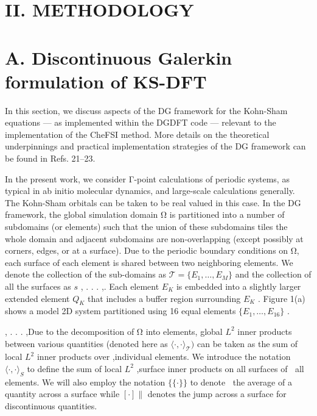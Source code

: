 \documentclass[
  10
]{article}
\begin{document}
\section{II. METHODOLOGY}\label{ii.-methodology}

\section{A. Discontinuous Galerkin formulation of
KS-DFT}\label{a.-discontinuous-galerkin-formulation-of-ks-dft}

In this section, we discuss aspects of the DG framework for the
Kohn-Sham equations --- as implemented within the DGDFT code ---
relevant to the implementation of the CheFSI method. More details on the
theoretical underpinnings and practical implementation strategies of the
DG framework can be found in Refs. 21--23.

In the present work, we consider Γ-point calculations of periodic
systems, as typical in ab initio molecular dynamics, and large-scale
calculations generally. The Kohn-Sham orbitals can be taken to be real
valued in this case. In the DG framework, the global simulation domain Ω
is partitioned into a number of subdomains (or elements) such that the
union of these subdomains tiles the whole domain and adjacent subdomains
are non-overlapping (except possibly at corners, edges, or at a
surface). Due to the periodic boundary conditions on Ω, each surface of
each element is shared between two neighboring elements. We denote the
collection of the sub-domains as
\(\mathcal { T } = \{ E _ { 1 } , \dots , E _ { M } \}\) and the
collection of all the surfaces as \(s\) , . . . ,. Each element
\(E _ { K }\) is embedded into a slightly larger extended element
\(Q _ { K }\) that includes a buffer region surrounding \(E _ { K }\) .
Figure 1(a) shows a model 2D system partitioned using 16 equal elements
\(\{ E _ { 1 } , \ldots , E _ { 1 6 } \}\) .

, . . . ,Due to the decomposition of Ω into elements, global
\(L ^ { 2 }\) inner products between various quantities (denoted here as
\(\langle \cdot , \cdot \rangle _ { \mathcal { T } } )\) can be taken as
the sum of local \(L ^ { 2 }\) inner products over ,individual elements.
We introduce the notation \(\langle \cdot , \cdot \rangle _ { S }\) to
define the sum of local \(L ^ { 2 }\) ,surface inner products on all
surfaces of all elements. We will also employ the notation
\(\{ \{ \cdot \} \}\) to denote the average of a quantity across a
surface while \(\left[ \cdot \right] \parallel\) denotes the jump across
a surface for discontinuous quantities.
\end{document}
